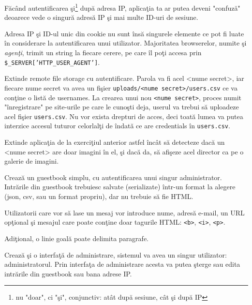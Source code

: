 Făcând autentificarea şi\footnote{nu "doar", ci "şi", conjunctiv: atât
după sesiune, cât şi după IP} după adresa IP, aplicaţia ta ar putea
deveni "confuză" deoarece vede o singură adresă IP şi mai multe
ID-uri de sesiune.

Adresa IP şi ID-ul unic din cookie nu sunt însă singurele elemente
ce pot fi luate în considerare la autentificarea unui utilizator.
Majoritatea browserelor, numite şi \textsl{agenţi}, trimit un string
la fiecare cerere, pe care îl poţi accesa prin \texttt{\$\_SERVER['HTTP\_USER\_AGENT']}.

\begin{Exercise}[title={O schemă de autentificare ieşită din comun},difficulty=2]
Extinde {\glqq}remote file storage{\grqq} cu autentificare.
Parola va fi acel {\glqq}<nume secret>{\grqq}, iar fiecare {\glqq}nume
secret{\grqq} va avea un fişier \texttt{uploads/<nume secret>/users.csv}
ce va conţine o listă de usernames. La crearea unui nou \texttt{<nume secret>},
proces numit "înregistrare" pe site-urile pe care le cunoşti deja,
userul va trebui să uploadeze acel fişier \texttt{users.csv}. Nu vor exista
drepturi de acces, deci toată lumea va putea interzice accesul tuturor celorlalţi
de \^indată ce are credentials \^in \texttt{users.csv}.
\end{Exercise}

\begin{Exercise}[title={Remote file storage cu galerie de imagini}]
Extinde aplicaţia de la exerciţiul anterior astfel încât să detecteze
dacă un {\glqq}<nume secret>{\grqq} are doar imagini în el, şi dacă
da, să afişeze acel director ca pe o galerie de imagini.
\end{Exercise}

\begin{Exercise}[title={Guestbook I},difficulty=2]
Crează un guestbook simplu, cu autentificarea unui singur
administrator. Intrările din guestbook trebuiesc salvate (serializate)
într-un format la alegere (json, csv, sau un format propriu), dar
nu trebuie să fie HTML.

Utilizatorii care vor să lase un mesaj vor introduce nume, adresă e-mail, un 
URL opţional şi mesajul care poate conţine doar tagurile HTML:
\texttt{<b>}, \texttt{<i>}, \texttt{<p>}.

Adiţional, o linie goală poate delimita paragrafe.

Crează şi o interfaţă de administrare, sistemul va avea un singur utilizator:
administratorul. Prin interfaţa de administrare acesta va putea şterge sau edita
intrările din guestbook sau bana adrese IP.
\end{Exercise}


